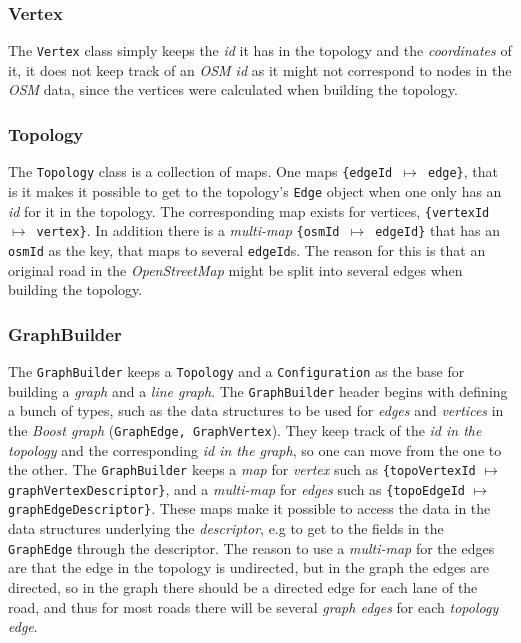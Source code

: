 \documentclass[../main.tex]{subfiles}
\begin{document}
\subsubsection{Vertex}
The \texttt{Vertex} class simply keeps the \textit{id} it has in the topology and the \textit{coordinates} of it, it does not keep track of an \textit{OSM id} as it might not correspond to nodes in the \textit{OSM} data, since the vertices were calculated when building the topology.

\subsubsection{Topology}
The \texttt{Topology} class is a collection of maps. One maps \texttt{\{edgeId $\mapsto$ edge\}}, that is it makes it possible to get to the topology's \texttt{Edge} object when one only has an \textit{id} for it in the topology. The corresponding map exists for vertices, \texttt{\{vertexId $\mapsto$ vertex\}}. In addition there is a \textit{multi-map} \texttt{\{osmId $\mapsto$ edgeId\}} that has an \texttt{osmId} as the key, that maps to several \texttt{edgeId}s. The reason for this is that an original road in the \textit{OpenStreetMap} might be split into several edges when building the topology.

\subsubsection{GraphBuilder}
The \texttt{GraphBuilder} keeps a \texttt{Topology} and a \texttt{Configuration} as the base for building a \textit{graph} and a \textit{line graph}.
The \texttt{GraphBuilder} header begins with defining a bunch of types, such as the data structures to be used for \textit{edges} and \textit{vertices} in the \textit{Boost graph} (\texttt{GraphEdge, GraphVertex}). They keep track of the \textit{id in the topology} and the corresponding \textit{id in the graph}, so one can move from the one to the other. The \texttt{GraphBuilder} keeps a \textit{map} for \textit{vertex} such as \texttt{\{topoVertexId} $\mapsto$ \texttt{graphVertexDescriptor\}}, and a \textit{multi-map} for \textit{edges} such as \texttt{\{topoEdgeId} $\mapsto$ \texttt{graphEdgeDescriptor\}}. These maps make it possible to access the data in the data structures underlying the \textit{descriptor}, e.g to get to the fields in the \texttt{GraphEdge} through the descriptor. The reason to use a \textit{multi-map} for the edges are that the edge in the topology is undirected, but in the graph the edges are directed, so in the graph there should be a directed edge for each lane of the road, and thus for most roads there will be several \textit{graph edges} for each \textit{topology edge}.
\end{document}
